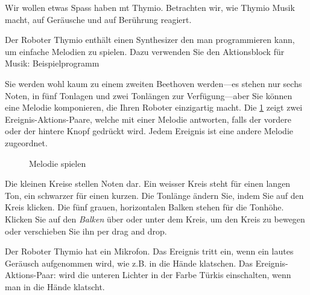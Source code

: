 \label{ch.bells}
Wir wollen etwas Spass haben mt Thymio. Betrachten wir, wie Thymio Musik macht, auf Geräusche und auf Berührung reagiert.


Der Roboter Thymio enthält einen Synthesizer den man programmieren kann,
um einfache Melodien zu spielen. Dazu verwenden Sie den Aktionsblock für Musik: 
{\raggedleft \hfill Beispielprogramm }

Sie werden wohl kaum zu einem zweiten Beethoven werden---es stehen nur sechs Noten, in fünf Tonlagen und zwei Tonlängen zur Verfügung---aber Sie können eine Melodie komponieren, die Ihren Roboter einzigartig macht. Die \cref{fig.music} zeigt zwei Ereignis-Aktions-Paare, welche mit einer Melodie antworten, falls der vordere oder der hintere Knopf gedrückt wird. Jedem Ereignis ist eine andere Melodie zugeordnet.

\begin{figure}
\begin{center}
\caption{Melodie spielen}\label{fig.music}
\end{center}
\end{figure}

Die kleinen Kreise stellen Noten dar. Ein weisser Kreis steht für einen langen Ton, ein schwarzer für einen kurzen. Die Tonlänge ändern Sie, indem Sie auf den Kreis klicken. Die fünf grauen, horizontalen Balken stehen für die Tonhöhe. Klicken Sie auf den \emph{Balken} über oder unter dem Kreis, um den Kreis zu bewegen oder verschieben Sie ihn per drag and drop. 



Der Roboter Thymio hat ein Mikrofon. Das Ereignis  tritt ein, wenn ein lautes Geräusch aufgenommen wird, wie z.B. in die Hände klatschen. Das Ereignis-Aktions-Paar: 
wird die unteren Lichter in der Farbe Türkis einschalten, wenn man in die Hände klatscht.


